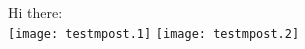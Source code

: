 \documentclass{article}
\begin{document}
Hi there: \\
\texttt{[image: testmpost.1]}
\texttt{[image: testmpost.2]}
\end{document}
